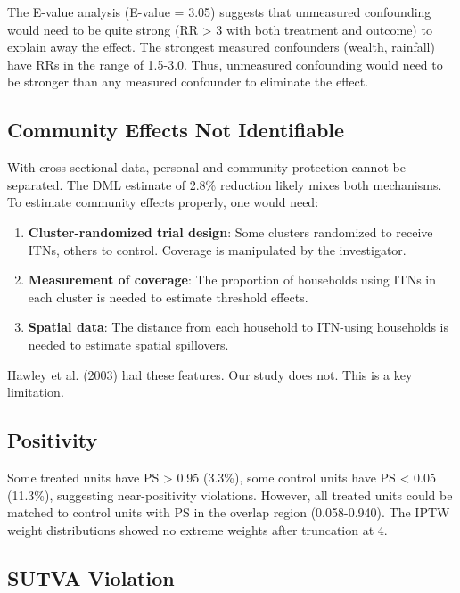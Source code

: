The E-value analysis (E-value = 3.05) suggests that unmeasured confounding would need to be quite strong (RR > 3 with both treatment and outcome) to explain away the effect. The strongest measured confounders (wealth, rainfall) have RRs in the range of 1.5-3.0. Thus, unmeasured confounding would need to be stronger than any measured confounder to eliminate the effect.

\subsection{Community Effects Not Identifiable}

With cross-sectional data, personal and community protection cannot be separated. The DML estimate of 2.8\% reduction likely mixes both mechanisms. To estimate community effects properly, one would need:

\begin{enumerate}
	\item \textbf{Cluster-randomized trial design}: Some clusters randomized to receive ITNs, others to control. Coverage is manipulated by the investigator.
	
	\item \textbf{Measurement of coverage}: The proportion of households using ITNs in each cluster is needed to estimate threshold effects.
	
	\item \textbf{Spatial data}: The distance from each household to ITN-using households is needed to estimate spatial spillovers.
\end{enumerate}

Hawley et al. (2003) had these features. Our study does not. This is a key limitation.

\subsection{Positivity}

Some treated units have PS > 0.95 (3.3\%), some control units have PS < 0.05 (11.3\%), suggesting near-positivity violations. However, all treated units could be matched to control units with PS in the overlap region (0.058-0.940). The IPTW weight distributions showed no extreme weights after truncation at 4.

\subsection{SUTVA Violation}

